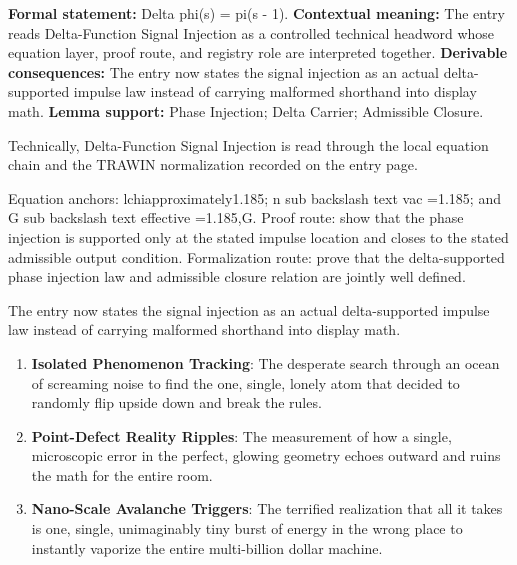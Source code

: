 \begingroup\footnotesize\setlength{\emergencystretch}{3em}\sloppy
\textbf{Formal statement:} Delta phi(s) = pi(s - 1). \textbf{Contextual meaning:} The entry reads Delta-Function Signal Injection as a controlled technical headword whose equation layer, proof route, and registry role are interpreted together. \textbf{Derivable consequences:} The entry now states the signal injection as an actual delta-supported impulse law instead of carrying malformed shorthand into display math. \textbf{Lemma support:} Phase Injection; Delta Carrier; Admissible Closure.\par
\endgroup

Technically, Delta-Function Signal Injection is read through the local equation chain and the TRAWIN normalization recorded on the entry page.

Equation anchors: lchiapproximately1.185; n sub backslash text vac =1.185; and G sub backslash text effective =1.185,G. Proof route: show that the phase injection is supported only at the stated impulse location and closes to the stated admissible output condition. Formalization route: prove that the delta-supported phase injection law and admissible closure relation are jointly well defined.

The entry now states the signal injection as an actual delta-supported impulse law instead of carrying malformed shorthand into display math.
\endgroup

\begin{enumerate}[leftmargin=1.6em,itemsep=6pt,topsep=4pt]
\item \textbf{Isolated Phenomenon Tracking}: The desperate search through an ocean of screaming noise to find the one, single, lonely atom that decided to randomly flip upside down and break the rules.
\item \textbf{Point-Defect Reality Ripples}: The measurement of how a single, microscopic error in the perfect, glowing geometry echoes outward and ruins the math for the entire room.
\item \textbf{Nano-Scale Avalanche Triggers}: The terrified realization that all it takes is one, single, unimaginably tiny burst of energy in the wrong place to instantly vaporize the entire multi-billion dollar machine.
\end{enumerate}

